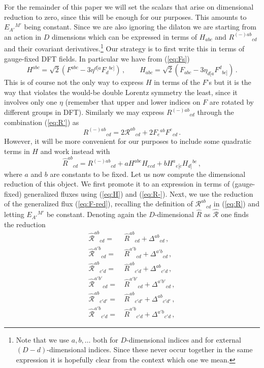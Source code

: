\documentclass[a4paper,11pt]{article}
\begin{document}
For the remainder of this paper we will set the scalars that arise on dimensional reduction to zero, since this will be enough for our purposes. This amounts to $E_{A'}{}^{M'}$ being constant. Since we are also ignoring the dilaton we are starting from an action in $D$ dimensions which can be expressed in terms of $H_{abc}$ and $R^{(-)ab}{}_{cd}$ and their covariant derivatives.\footnote{Note that we use $a,b,\ldots$ both for $D$-dimensional indices and for external $(D-d)$-dimensional indices. Since these never occur together in the same expression it is hopefully clear from the context which one we mean.} Our strategy is to first write this in terms of gauge-fixed DFT fields. In particular we have from (\ref{eq:Fs})
\begin{equation}
H^{abc}=\sqrt2(F^{abc}-3\eta^{d[a}F_d{}^{bc]})\,,\qquad
H_{abc}=\sqrt2(F_{abc}-3\eta_{d[a}F^d{}_{bc]})\,.
\label{eq:H}
\end{equation}
This is of course not the only way to express $H$ in terms of the $F$'s but it is the way that violates the would-be double Lorentz symmetry the least, since it involves only one $\eta$ (remember that upper and lower indices on $F$ are rotated by different groups in DFT). Similarly we may express $R^{(-)ab}{}_{cd}$ through the combination (\ref{eq:R'}) as
\begin{equation}
R^{(-)ab}{}_{cd}=2\mathcal R^{ab}{}_{cd}+2F_e{}^{ab}F^e{}_{cd}\,.
\label{eq:R-}
\end{equation}
However, it will be more convenient for our purposes to include some quadratic terms in $H$ and work instead with
\begin{equation}
\hat R^{ab}{}_{cd}=
R^{(-)ab}{}_{cd}
+aH^{abe}H_{ecd}
+bH^a{}_{e[c}H_{d]}{}^{be}\,,
\label{eq:Rhat}
\end{equation}
where $a$ and $b$ are constants to be fixed. Let us now compute the dimensional reduction of this object. We first promote it to an expression in terms of (gauge-fixed) generalized fluxes using (\ref{eq:H}) and (\ref{eq:R-}). Next, we use the reduction of the generalized flux (\ref{eq:F-red}), recalling the definition of $\mathcal R^{ab}{}_{cd}$ in (\ref{eq:R}) and letting $E_{A'}{}^{M'}$ be constant. Denoting again the $D$-dimensional $\hat R$ as $\hat{\mathcal R}$ one finds the reduction
\begin{equation}
\begin{aligned}
\hat{\mathcal R}^{ab}{}_{cd}=&\,\hat R^{ab}{}_{cd}+\Delta^{ab}{}_{cd}\,,\\
\hat{\mathcal R}^{a'b}{}_{cd}=&\,\hat R^{a'b}{}_{cd}+\Delta^{a'b}{}_{cd}\,,\\
\hat{\mathcal R}^{ab}{}_{c'd}=&\,\hat R^{ab}{}_{c'd}+\Delta^{ab}{}_{c'd}\,,\\
\hat{\mathcal R}^{a'b'}{}_{cd}=&\,\hat R^{a'b'}{}_{cd}+\Delta^{a'b'}{}_{cd}\,,\\
\hat{\mathcal R}^{ab}{}_{c'd'}=&\,\hat R^{ab}{}_{c'd'}+\Delta^{ab}{}_{c'd'}\,,\\
\hat{\mathcal R}^{a'b}{}_{c'd}=&\,\hat R^{a'b}{}_{c'd}+\Delta^{a'b}{}_{c'd}\,,
\end{aligned}
\end{equation}
\end{document}
